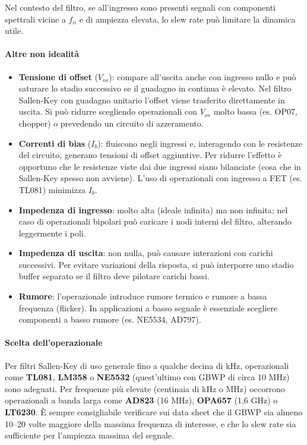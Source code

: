 Nel contesto del filtro, se all'ingresso sono presenti segnali con componenti spettrali vicine a \(f_n\) e di ampiezza elevata, lo slew rate può limitare la dinamica utile.

\paragraph{Altre non idealità}
\begin{itemize}
    \item \textbf{Tensione di offset} (\(V_{os}\)): compare all'uscita anche con ingresso nullo e può saturare lo stadio successivo se il guadagno in continua è elevato. Nel filtro Sallen-Key con guadagno unitario l'offset viene trasferito direttamente in uscita. Si può ridurre scegliendo operazionali con \(V_{os}\) molto bassa (es. OP07, chopper) o prevedendo un circuito di azzeramento.
    \item \textbf{Correnti di bias} (\(I_b\)): fluiscono negli ingressi e, interagendo con le resistenze del circuito, generano tensioni di offset aggiuntive. Per ridurre l'effetto è opportuno che le resistenze viste dai due ingressi siano bilanciate (cosa che in Sallen-Key spesso non avviene). L'uso di operazionali con ingresso a FET (es. TL081) minimizza \(I_b\).
    \item \textbf{Impedenza di ingresso}: molto alta (ideale infinita) ma non infinita; nel caso di operazionali bipolari può caricare i nodi interni del filtro, alterando leggermente i poli.
    \item \textbf{Impedenza di uscita}: non nulla, può causare interazioni con carichi successivi. Per evitare variazioni della risposta, si può interporre uno stadio buffer separato se il filtro deve pilotare carichi bassi.
    \item \textbf{Rumore}: l'operazionale introduce rumore termico e rumore a bassa frequenza (flicker). In applicazioni a basso segnale è essenziale scegliere componenti a basso rumore (es. NE5534, AD797).
\end{itemize}

\paragraph{Scelta dell'operazionale}
Per filtri Sallen-Key di uso generale fino a qualche decina di kHz, operazionali come \textbf{TL081}, \textbf{LM358} o \textbf{NE5532} (quest'ultimo con GBWP di circa 10 MHz) sono adeguati. Per frequenze più elevate (centinaia di kHz o MHz) occorrono operazionali a banda larga come \textbf{AD823} (16 MHz), \textbf{OPA657} (1,6 GHz) o \textbf{LT6230}. È sempre consigliabile verificare sui data sheet che il GBWP sia almeno 10–20 volte maggiore della massima frequenza di interesse, e che lo slew rate sia sufficiente per l'ampiezza massima del segnale.




